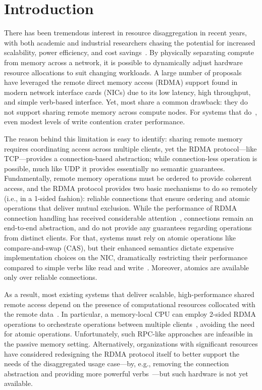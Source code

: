 \section{Introduction}

There has been tremendous interest in resource
disaggregation in recent years, with both academic and
industrial researchers chasing the potential for increased
scalability, power efficiency, and cost
savings~\cite{blade-server,rethinking,the-machine,requirements,clio-arxiv,firebox,leap,zombieland,storm,aifm,supernic}.
By physically separating compute from memory across a
network, it is possible to dynamically adjust hardware
resource allocations to suit changing workloads.  A large
number of
proposals~\cite{infiniswap,fastswap,legoos,clover,sherman,farm,reigons,fusee}
have leveraged the remote direct memory access (RDMA)
support found in modern network interface cards (NICs) due
to its low latency, high throughput, and simple verb-based
interface.  Yet, most share a common drawback: they do not
support sharing remote memory across compute nodes.  For
systems that do~\cite{clover,sherman,fusee}, even modest levels of write
contention crater performance.

The reason behind this limitation is easy to identify: sharing remote
memory requires coordinating access across multiple clients, yet the
RDMA protocol---like TCP---provides a connection-based abstraction;
while connection-less operation is possible, much like UDP it provides
essentially no semantic guarantees.  Fundamentally, remote memory
operations must be ordered to provide coherent access, and the RDMA
protocol provides two basic mechanisms to do so remotely (i.e., in a
1-sided fashion): reliable connections that ensure ordering and atomic
operations that deliver mutual exclusion.  While the performance of
RDMA connection handling has received considerable attention~\cite{farm,storm,scalerpc},
connections remain an end-to-end abstraction, and do not provide any
guarantees regarding operations from distinct clients.  For that,
systems must rely on atomic operations like compare-and-swap (CAS),
but their enhanced semantics dictate expensive implementation choices
on the NIC, dramatically restricting their performance compared to
simple verbs like read and write~\cite{design-guidelines}.  Moreover,
atomics are available only over reliable connections.

As a result, most existing systems that deliver scalable,
high-performance shared remote access depend on the presence of
computational resources collocated with the remote
data~\cite{herd,cell,farm,pilaf,storm}.  In particular, a
memory-local CPU can employ 2-sided RDMA operations to orchestrate
operations between multiple clients~\cite{herd,fasst}, avoiding the need
for atomic operations.  Unfortunately, such RPC-like approaches are
infeasible in the passive memory setting.  Alternatively,
organizations with significant resources have considered redesigning
the RDMA protocol itself to better support the needs of the
disaggregated usage case---by, e.g., removing the connection
abstraction and providing more powerful verbs~\cite{filemr,rma,star}---but such
hardware is not yet available.

